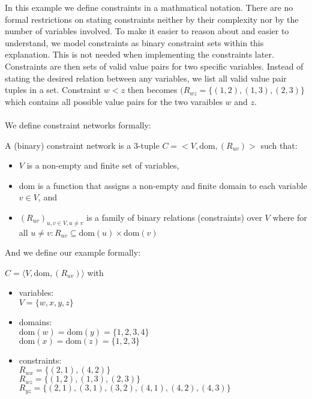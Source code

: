 In this example we define constraints in a mathmatical notation. There are no formal restrictions on stating constraints neither by their complexity nor by the number of variables involved. To make it easier to reason about and easier to understand, we model constraints as binary constraint sets within this explanation. This is not needed when implementing the constraints later. Constraints are then sets of valid value pairs for two specific variables. Instead of stating the desired relation between any variables, we list all valid value pair tuples in a set. Constraint $w < z$ then becomes $(R_{wz} = \{(1, 2), (1, 3), (2, 3)\}$ which contains all possible value pairs for the two varaibles $w$ and $z$. \\ \\

We define constraint networks formally:

\begin{tcolorbox}
	A (binary) constraint network is a 3-tuple $C = <V, \text{dom}, (R_{uv})>$ such that:
	\begin{itemize}
		\item $V$ is a non-empty and finite set of variables,
		\item dom is a function that assigns a non-empty and finite domain to each variable $v \in V$, and
		\item $(R_{uv})_{u,v \in V, u \neq v}$ is a family of binary relations (constraints) over $V$ where for all $u \neq v: R_{uv} \subseteq \text{dom}(u) \times \text{dom}(v)$
	\end{itemize}
\end{tcolorbox}

And we define our example formally:

\begin{tcolorbox}
	$C = \langle V, \text{dom}, (R_{uv})\rangle$ with
	\begin{itemize}
		\item variables: \\
		      $V = \{w, x, y, z\}$
		\item domains: \\
		      $\text{dom}(w) = \text{dom}(y) = \{1, 2, 3, 4\}$ \\
		      $\text{dom}(x) = \text{dom}(z) = \{1, 2, 3\}$
		\item constraints: \\
		      $R_{wx} = \{(2, 1), (4, 2)\}$ \\
		      $R_{wz} = \{(1, 2), (1, 3), (2, 3)\}$ \\
		      $R_{yz} = \{(2, 1), (3, 1), (3, 2), (4, 1), (4, 2), (4, 3)\}$ \\
	\end{itemize}
\end{tcolorbox}

